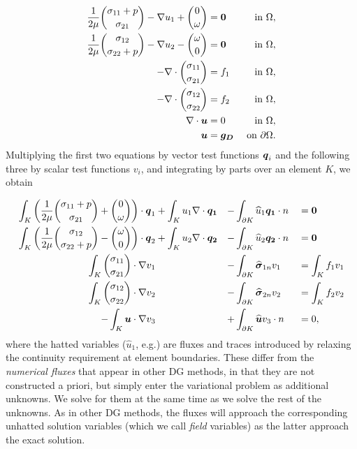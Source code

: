 \begin{align*}
\frac{1}{2 \mu}{\sigma_{11} + p \choose \sigma_{21}} - \NVRgrad u_{1} + {0 \choose \omega} &= \NVRvect{0} & \text{ in } \Omega, \\
\frac{1}{2 \mu}{\sigma_{12} \choose \sigma_{22} + p} - \NVRgrad u_{2} - {\omega \choose 0} &= \NVRvect{0}  & \text{ in } \Omega, \\
-\NVRdiv {\sigma_{11} \choose \sigma_{21}} &= f_{1} & \text{ in } \Omega, \\
-\NVRdiv {\sigma_{12} \choose \sigma_{22}} &= f_{2} & \text{ in } \Omega, \\
\NVRdiv \NVRvect{u} &= 0 & \text{ in } \Omega, \\\
\NVRvect{u} &= \NVRvect{g_{D}} & \text{ on } \partial\Omega.
\end{align*}
Multiplying the first two equations by vector test functions $\NVRvect{q}_{i}$ and the following three by scalar test functions $v_{i}$, and integrating by parts over an element $K$, we obtain

\begin{align*}
\int_{K} \left(\frac{1}{2 \mu}{\sigma_{11} + p \choose \sigma_{21}} + {0 \choose \omega} \right) \cdot \NVRvect{q}_{1} &+ \int_{K} u_{1} \NVRdiv \NVRvect{q_{1}} &-& \int_{\partial K} \widehat{u}_{1} \NVRvect{q_{1}} \cdot n &&=\NVRvect{0} \\
\int_{K} \left(\frac{1}{2 \mu}{\sigma_{12} \choose \sigma_{22} + p} - {\omega \choose 0}\right) \cdot \NVRvect{q}_{2} &+ \int_{K} u_{2} \NVRdiv \NVRvect{q_{2}} &-& \int_{\partial K} \widehat{u}_{2} \NVRvect{q_{2}} \cdot n &&= \NVRvect{0}\\
\int_{K}  {\sigma_{11} \choose \sigma_{21}} \cdot \NVRgrad v_{1} &&-& \int_{\partial K} \widehat{\NVRvect{\sigma}}_{1n} v_{1} &&= \int_{K} f_{1} v_{1} \\
\int_{K} {\sigma_{12} \choose \sigma_{22}} \cdot \NVRgrad v_{2} &&-& \int_{\partial K} \widehat{\NVRvect{\sigma}}_{2n} v_{2}  &&= \int_{K} f_{2} v_{2} \\
-\int_{K} \NVRvect{u} \cdot \NVRgrad v_{3} &&+& \int_{\partial K} \widehat{\NVRvect{u}} v_{3} \cdot n &&= 0,
\end{align*}
where the hatted variables ($\widehat{u}_{1}$, e.g.) are fluxes and traces introduced by relaxing the continuity requirement at element boundaries.  These differ from the \emph{numerical fluxes} that appear in other DG methods, in that they are not constructed a priori, but simply enter the variational problem as additional unknowns. We solve for them at the same time as we solve 
the rest of the unknowns.  As in other DG methods, the fluxes will approach the corresponding unhatted solution variables (which we call \emph{field} variables) as the latter approach the exact solution.

